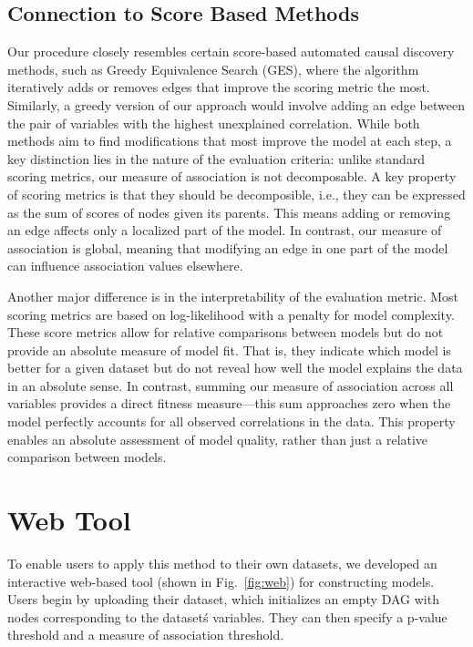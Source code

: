 \documentclass{uai2025} %
\begin{document}
\subsection{Connection to Score Based Methods}

Our procedure closely resembles certain score-based automated causal discovery
methods, such as Greedy Equivalence Search (GES), where the algorithm
iteratively adds or removes edges that improve the scoring metric the most.
Similarly, a greedy version of our approach would involve adding an edge
between the pair of variables with the highest unexplained correlation. While
both methods aim to find modifications that most improve the model at each
step, a key distinction lies in the nature of the evaluation criteria: unlike
standard scoring metrics, our measure of association is not decomposable. A key
property of scoring metrics is that they should be decomposible, i.e., they can
be expressed as the sum of scores of nodes given its parents. This means adding
or removing an edge affects only a localized part of the model. In contrast,
our measure of association is global, meaning that modifying an edge in one
part of the model can influence association values elsewhere.

Another major difference is in the interpretability of the evaluation metric.
Most scoring metrics are based on log-likelihood with a penalty for model
complexity. These score metrics allow for relative comparisons between models
but do not provide an absolute measure of model fit. That is, they indicate
which model is better for a given dataset but do not reveal how well the model
explains the data in an absolute sense. In contrast, summing our measure of
association across all variables provides a direct fitness measure—this sum
approaches zero when the model perfectly accounts for all observed correlations
in the data. This property enables an absolute assessment of model quality,
rather than just a relative comparison between models.

\section{Web Tool}
\label{sec:web}
To enable users to apply this method to their own datasets, we developed an
interactive web-based tool (shown in Fig.~\ref{fig:web}) for constructing
models. Users begin by uploading their dataset, which initializes an empty DAG
with nodes corresponding to the dataset\'s variables. They can then specify a
p-value threshold and a measure of association threshold.
\end{document}
